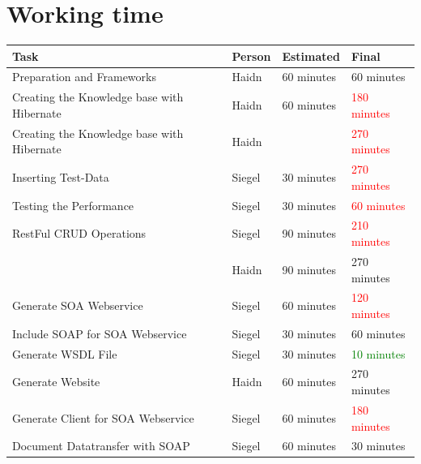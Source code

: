 \documentclass[12pt]{article}
\begin{document}
\section{Working time}
\begin{center}
\end{center}
\begin{table}[h]
\begin{tabular}{|p{}|p{}|p{}|p{}|}
\hline
\textbf{Task}    & \textbf{Person}   & \textbf{Estimated}  & \textbf{Final}\\ \hline \hline

Preparation and Frameworks & Haidn &  60 minutes & 60 minutes  \\ \hline 


Creating the Knowledge base with Hibernate & Haidn &  60   minutes & \textcolor{red}{180 minutes}
   \\ \hline 
   Creating the Knowledge base with Hibernate & Haidn &   & \textcolor{red}{270 minutes}
   \\  

Inserting Test-Data  & Siegel &  30 minutes  &   \textcolor{red}{270 minutes}  \\ \hline 

Testing the Performance  & Siegel &  30  minutes  &  \textcolor{red}{60  minutes}  \\ \hline 

RestFul CRUD Operations & Siegel &  90   minutes & \textcolor{red}{210 minutes} \\  
  & Haidn &  90 minutes  &  270   minutes  \\ \hline 


Generate SOA Webservice & Siegel &  60 minutes &  \textcolor{red}{120 minutes} \\ \hline 

Include SOAP for SOA Webservice & Siegel &  30 minutes &  60 minutes \\ \hline 
Generate WSDL File & Siegel &  30 minutes & \textcolor{green}{10 minutes}  \\ \hline 

Generate Website & Haidn &  60 minutes &  270 minutes \\ \hline 

Generate Client for SOA Webservice & Siegel &  60 minutes & \textcolor{red}{180 minutes} \\ \hline 

Document Datatransfer with SOAP & Siegel &  60 minutes & 30  minutes \\ \hline 


\end{tabular}
\end{table}
\end{document}
